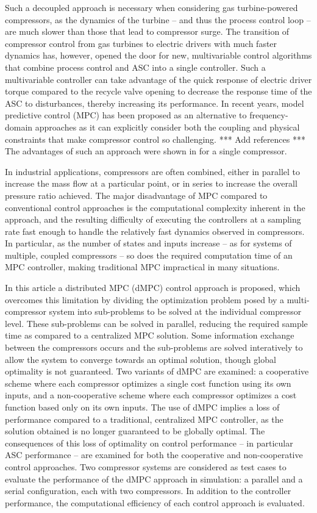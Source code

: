 Such a decoupled approach is necessary when considering gas turbine-powered compressors, as the dynamics of the turbine -- and thus the process control loop -- are much slower than those that lead to compressor surge. 
The transition of compressor control from gas turbines to electric drivers with much faster dynamics has, however, opened the door for new, multivariable control algorithms that combine process control and ASC into a single controller.
Such a multivariable controller can take advantage of the quick response of electric driver torque compared to the recycle valve opening to decrease the response time of the ASC to disturbances, thereby increasing its performance.
In recent years, model predictive control (MPC) has been proposed as an alternative to frequency-domain approaches as it can explicitly consider both the coupling and physical constraints that make compressor control so challenging.
*** Add references ***
The advantages of such an approach were shown in \cite{Cortinovis2015} for a single compressor.

In industrial applications, compressors are often combined, either in parallel to increase the mass flow at a particular point, or in series to increase the overall pressure ratio achieved.
The major disadvantage of MPC compared to conventional control approaches is the computational complexity inherent in the approach, and the resulting difficulty of executing the controllers at a sampling rate fast enough to handle the relatively fast dynamics observed in compressors. 
In particular, as the number of states and inputs increase -- as for systems of multiple, coupled compressors -- so does the required computation time of an MPC controller, making traditional MPC impractical in many situations. 

In this article a distributed MPC (dMPC) control approach is proposed, which overcomes this limitation by dividing the optimization problem posed by a multi-compressor system into sub-problems to be solved at the individual compressor level.
These sub-problems can be solved in parallel, reducing the required sample time as compared to a centralized MPC solution.
Some information exchange between the compressors occurs and the sub-problems are solved interatively to allow the system to converge towards an optimal solution, though global optimality is not guaranteed.
Two variants of dMPC are examined: a cooperative scheme where each compressor optimizes a single cost function using its own inputs, and a non-cooperative scheme where each compressor optimizes a cost function based only on its own inputs.
The use of dMPC implies a loss of performance compared to a traditional, centralized MPC controller, as the solution obtained is no longer guaranteed to be globally optimal.
The consequences of this loss of optimality on control performance -- in particular ASC performance -- are examined for both the cooperative and non-cooperative control approaches.
Two compressor systems are considered as test cases to evaluate the performance of the dMPC approach in simulation: a parallel and a serial configuration, each with two compressors.
In addition to the controller performance, the computational efficiency of each control approach is evaluated.



